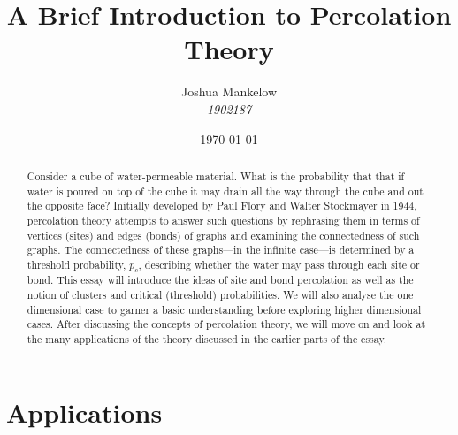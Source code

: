 \documentclass[a4paper,11pt]{article}
\title{\textbf{ A Brief Introduction to Percolation Theory }}
\author{Joshua Mankelow \\ \textit{1902187}}
\date{\today}
\theoremstyle{plain} %
\theoremstyle{definition} %
\theoremstyle{remark} %
\begin{document}
  
\maketitle


\begin{abstract}
  Consider a cube of water-permeable material. What is the probability that that if water is poured on top of the cube it may drain all the way through
  the cube and out the opposite face? 
  Initially developed by Paul Flory and Walter Stockmayer in 1944, percolation theory attempts to answer such questions by rephrasing them
  in terms of vertices (sites) and edges (bonds) of graphs and examining the connectedness of such graphs. The connectedness of these graphs---in the infinite case---is
  determined by a threshold probability, $p_c$, describing whether the water may pass through each site or bond.
  This essay will introduce the ideas of site and bond percolation as well as the notion of clusters and critical (threshold) probabilities.
  We will also analyse the one dimensional case to garner a basic understanding before exploring higher dimensional cases. After discussing the concepts of percolation theory, we will move on and look at the many applications of the
  theory discussed in the earlier parts of the essay.
\end{abstract}

\newpage

\tableofcontents

\newpage





\section{Applications}



\end{document}

